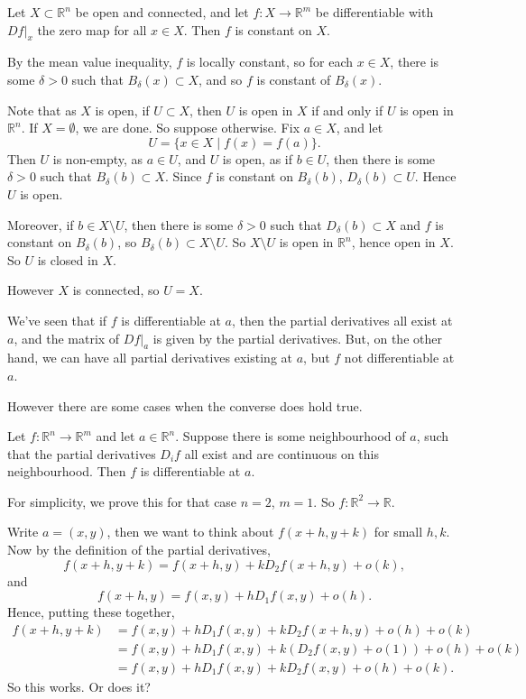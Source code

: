 \documentclass[12pt]{article}
\begin{document}
\begin{corollary}
	Let $X \subset \mathbb{R}^{n}$ be open and connected, and let $f : X \to \mathbb{R}^{m}$ be differentiable with $Df|_x$ the zero map for all $x \in X$. Then $f$ is constant on $X$.
\end{corollary}

\begin{proofbox}
	By the mean value inequality, $f$ is locally constant, so for each $x \in X$, there is some $\delta > 0$ such that $B_{\delta}(x) \subset X$, and so $f$ is constant of $B_{\delta}(x)$.

	Note that as $X$ is open, if $U \subset X$, then $U$ is open in $X$ if and only if $U$ is open in $\mathbb{R}^{n}$. If $X = \emptyset$, we are done. So suppose otherwise. Fix $a \in X$, and let
	\[
		U = \{x \in X \mid f(x) = f(a)\}
	.\]
	Then $U$ is non-empty, as $a \in U$, and $U$ is open, as if $b \in U$, then there is some $\delta > 0$ such that $B_{\delta}(b) \subset X$. Since $f$ is constant on $B_{\delta}(b)$, $D_{\delta}(b) \subset U$. Hence $U$ is open.

	Moreover, if $b \in X \setminus U$, then there is some $\delta > 0$ such that $D_{\delta}(b) \subset X$ and $f$ is constant on $B_{\delta}(b)$, so $B_{\delta}(b) \subset X\setminus U$. So $X \setminus U$ is open in $\mathbb{R}^{n}$, hence open in $X$. So $U$ is closed in $X$.

	However $X$ is connected, so $U = X$.
\end{proofbox}

We've seen that if $f$ is differentiable at $a$, then the partial derivatives all exist at $a$, and the matrix of $Df|_a$ is given by the partial derivatives. But, on the other hand, we can have all partial derivatives existing at $a$, but $f$ not differentiable at $a$.

However there are some cases when the converse does hold true.

\begin{theorem}
	Let $f : \mathbb{R}^{n} \to \mathbb{R}^{m}$ and let $a \in \mathbb{R}^{n}$. Suppose there is some neighbourhood of $a$, such that the partial derivatives $D_if$ all exist and are continuous on this neighbourhood. Then $f$ is differentiable at $a$.
\end{theorem}

For simplicity, we prove this for that case $n = 2$, $m = 1$. So $f : \mathbb{R}^2 \to \mathbb{R}$.

Write $a = (x, y)$, then we want to think about $f(x+h,y+k)$ for small $h, k$. Now by the definition of the partial derivatives,
\[
f(x+h,y+k) = f(x+h,y) + kD_2f(x+h, y) + o(k)
,\]
and
\[
f(x+h,y) = f(x, y) + hD_1f(x, y) + o(h)
.\]
Hence, putting these together,
\begin{align*}
	f(x+h,y+k) &= f(x, y) + hD_1f(x, y) + kD_2f(x+h,y) + o(h) + o(k) \\
		   &= f(x, y) + hD_1f(x, y) + k(D_2f(x, y) + o(1)) + o(h) + o(k) \\
		   &= f(x, y) + hD_1f(x, y) + kD_2f(x, y) + o(h) + o(k).
\end{align*}
So this works. Or does it?
\end{document}

